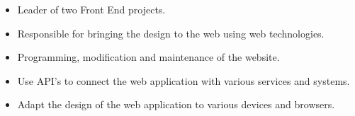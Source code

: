 
\begin{itemize}
    \item Leader of two Front End projects.
    \item Responsible for bringing the design to the web using web technologies.
    \item Programming, modification and maintenance of the website.
    \item Use API's to connect the web application with
various services and systems.
    \item Adapt the design of the web application to various
devices and browsers.
\end{itemize}
